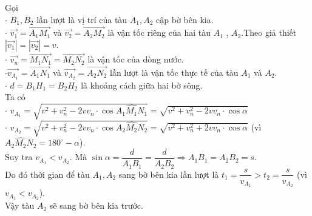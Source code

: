\begin{bt}
{\begin{center}
\end{center}
Gọi\\
$\cdot$ $B_1, B_2$ lần lượt là vị trí của tàu $A_1, A_2$ cập bờ bên kia.\\
$\cdot$ $\overrightarrow{v_1}=\overrightarrow{A_1M_1}$ và $\overrightarrow{v_2}=\overrightarrow{A_2M_2}$  là vận tốc riêng của hai tàu $A_1$ , $A_2$.Theo giả thiết $|\overrightarrow{v_1}|=|\overrightarrow{v_2}|=v$.\\
$\cdot$ $\overrightarrow{v_n}=\overrightarrow{M_1N_1}=\overrightarrow{M_2N_2}$ là vận tốc của dòng nước.\\
$\cdot$$\overrightarrow{v_{A_1}}=\overrightarrow{A_1N_1}$ và $\overrightarrow{v_{A_2}}=\overrightarrow{A_2N_2}$ lần lượt là vận tốc thực tế của tàu $A_1$ và $A_2$.\\
$\cdot$ $d=B_1H_1=B_2H_2$ là khoảng cách giữa hai bờ sông.\\
Ta có\\
$\cdot$ $v_{A_1}=\sqrt{v^2+v_n^2-2vv_n\cdot \cos \widehat {A_1M_1N_1} }=\sqrt{v^2+v_n^2-2vv_n\cdot \cos \alpha}$\\
$\cdot$  $v_{A_2}=\sqrt{v^2+v_n^2-2vv_n\cdot \cos \widehat {A_2M_2N_2} }=\sqrt{v^2+v_n^2+2vv_n\cdot \cos \alpha}$ (vì $\widehat {A_2M_2N_2}=180^\circ -\alpha $).\\
Suy tra $v_{A_1}<v_{A_2}$. Mà $\sin \alpha =\dfrac{d}{A_1B_1}=\dfrac{d}{A_2B_2}\Rightarrow A_1B_1=A_2B_2=s$. \\Do đó
thời gian để tàu $A_1,A_2$ sang bờ bên kia  lần lượt là $t_1=\dfrac{s}{v_{A_1}}>t_2=\dfrac{s}{v_{A_2}}$ (vì $v_{A_1}<v_{A_2}$).\\
Vậy tàu $A_2$ sẽ sang bờ bên kia trước.
}
\end{bt}




